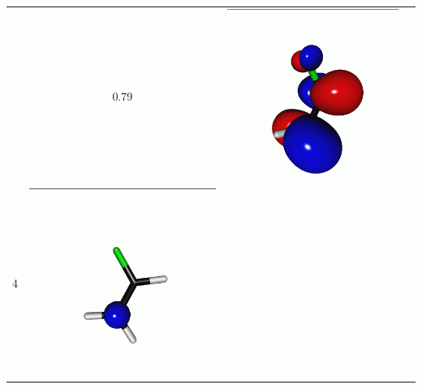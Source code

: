 \documentclass[journal=jctcce,manuscript=article]{achemso}
\begin{document}
\begin{table}[H]
\begin{tabular}{ c | c c c }
\begin{minipage}{0.2\textwidth}
     \end{minipage}
     & 0.79
     &  \begin{minipage}{0.2\textwidth}
         \centering
         \includegraphics[scale=0.10]{NTO/CH2CHF/2p.png}
     \end{minipage}
     \\
             4 &  
     \begin{minipage}{0.2\textwidth}
         \centering
         \includegraphics[scale=0.10]{NTO/CH2CHF/4h.png}

\end{minipage}
\end{tabular}
\end{table}
\end{document}
